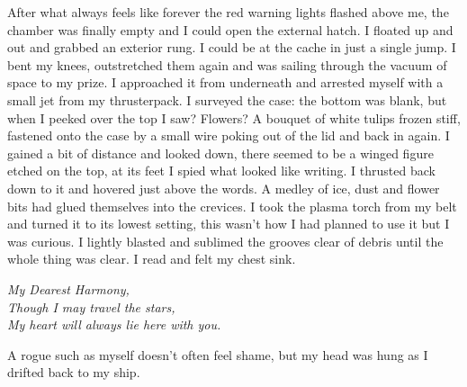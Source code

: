 After what always feels like forever the red warning lights flashed above me, the chamber was finally empty and I could open the external hatch. I floated up and out and grabbed an exterior rung. I could be at the cache in just a single jump. I bent my knees, outstretched them again and was sailing through the vacuum of space to my prize. I approached it from underneath and arrested myself with a small jet from my thrusterpack. I surveyed the case: the bottom was blank, but when I peeked over the top I saw? Flowers? A bouquet of white tulips frozen stiff, fastened onto the case by a small wire poking out of the lid and back in again. I gained a bit of distance and looked down, there seemed to be a winged figure etched on the top, at its feet I spied what looked like writing. I thrusted back down to it and hovered just above the words. A medley of ice, dust and flower bits had glued themselves into the crevices. I took the plasma torch from my belt and turned it to its lowest setting, this wasn't how I had planned to use it but I was curious. I lightly blasted and sublimed the grooves clear of debris until the whole thing was clear. I read and felt my chest sink.
\vspace{0.5mm}
\begin{center}
{\it My Dearest Harmony,\\
Though I may travel the stars,\\
My heart will always lie here with you.}
\end{center}
\vspace{0.5mm}
A rogue such as myself doesn't often feel shame, but my head was hung as I drifted back to my ship.
